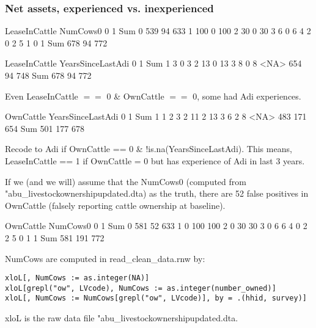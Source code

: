 
\subsubsection{Net assets, experienced vs. inexperienced}



\begin{Schunk}
\begin{Soutput}
        LeaseInCattle
NumCows0   0   1 Sum
     0   539  94 633
     1   100   0 100
     2    30   0  30
     3     6   0   6
     4     2   0   2
     5     1   0   1
     Sum 678  94 772
\end{Soutput}
\begin{Soutput}
                 LeaseInCattle
YearsSinceLastAdi   0   1 Sum
             1      3   0   3
             2     13   0  13
             3      8   0   8
             <NA> 654  94 748
             Sum  678  94 772
\end{Soutput}
\end{Schunk}
Even LeaseInCattle $==$ 0 \& OwnCattle $==$ 0, some had Adi experiences.
\begin{Schunk}
\begin{Soutput}
                 OwnCattle
YearsSinceLastAdi   0   1 Sum
             1      1   2   3
             2     11   2  13
             3      6   2   8
             <NA> 483 171 654
             Sum  501 177 678
\end{Soutput}
\end{Schunk}
Recode to Adi if OwnCattle == 0 \& $!$is.na(YearsSinceLastAdi). This means, \textsf{LeaseInCattle} == 1 if OwnCattle = 0 but has experience of Adi in last 3 years.

If we (and we will) assume that the \textsf{NumCows0} (computed from \textsf{"abu\_livestockownershipupdated.dta}) as the truth, there are 52 false positives in \textsf{OwnCattle} (falsely reporting cattle ownership at baseline). 
\begin{Schunk}
\begin{Soutput}
        OwnCattle
NumCows0   0   1 Sum
     0   581  52 633
     1     0 100 100
     2     0  30  30
     3     0   6   6
     4     0   2   2
     5     0   1   1
     Sum 581 191 772
\end{Soutput}
\end{Schunk}
NumCows are computed in \textsf{read\_clean\_data.rnw} by:
\begin{screen}
\verb+xloL[, NumCows := as.integer(NA)]+\\
\verb+xloL[grepl("ow", LVcode), NumCows := as.integer(number_owned)]+\\
\verb+xloL[, NumCows := NumCows[grepl("ow", LVcode)], by = .(hhid, survey)]+
\end{screen}
\textsf{xloL} is the raw data file \textsf{"abu\_livestockownershipupdated.dta}. 

